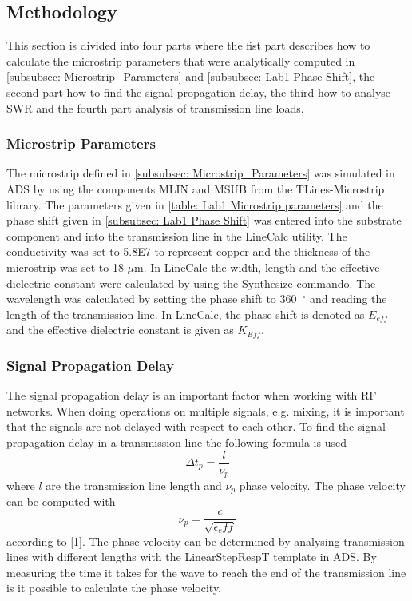 \documentclass[report.tex]{subfiles}
\begin{document}
\subsection{Methodology}\label{sec:Lab1 methodology}
This section is divided into four parts where the fist part describes how to calculate the microstrip parameters that were analytically computed in \ref{subsubsec: Microstrip_Parameters} and \ref{subsubsec: Lab1 Phase Shift}, the second part how to find the signal propagation delay, the third how to analyse SWR and the fourth part analysis of transmission line loads.

\subsubsection{Microstrip Parameters}
The microstrip defined in \ref{subsubsec: Microstrip_Parameters} was simulated in ADS by using the components MLIN and MSUB from the TLines-Microstrip library. The parameters given in \ref{table: Lab1 Microstrip parameters} and the phase shift given in \ref{subsubsec: Lab1 Phase Shift} was entered into the substrate component and into the transmission line in the LineCalc utility. The conductivity was set to 5.8E7 to represent copper and the thickness of the microstrip was set to 18 $\mu$m. In LineCalc the width, length and the effective dielectric constant were calculated by using the Synthesize commando. The wavelength was calculated by setting the phase shift to 360~$^\circ$ and reading the length of the transmission line. In LineCalc, the phase shift is denoted as $E_{eff}$ and the effective dielectric constant is given as $K_{Eff}$.

\subsubsection{Signal Propagation Delay}
The signal propagation delay is an important factor when working with RF networks. When doing operations on multiple signals, e.g. mixing, it is important that the signals are not delayed with respect to each other. To find the signal propagation delay in a transmission line the following formula is used
\begin{equation}\label{eq: Lab1 propagation delay}
	\Delta t_p = \dfrac{l}{\nu_p}
\end{equation}
where $l$ are the transmission line length and $\nu_p$ phase velocity. The phase velocity can be computed with
\begin{equation}\label{Lab1 eq: phase velocity}
	\nu_p = \dfrac{c}{\sqrt{\epsilon_eff}}
\end{equation}
according to [1].
The phase velocity can be determined by analysing transmission lines with different lengths with the LinearStepRespT template in ADS. By measuring the time it takes for the wave to reach the end of the transmission line is it possible to calculate the phase velocity.
\end{document}
